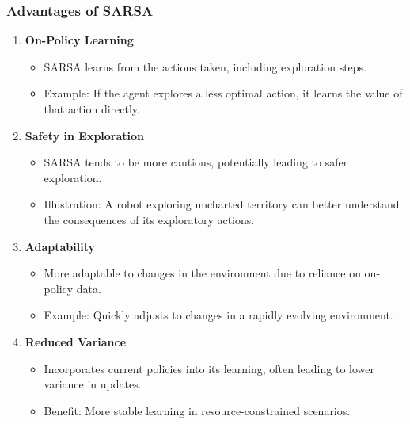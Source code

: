 \documentclass[aspectratio=169]{beamer}
\begin{document}
\begin{frame}[fragile]
    \frametitle{Advantages of SARSA}
    \begin{enumerate}
        \item \textbf{On-Policy Learning}
            \begin{itemize}
                \item SARSA learns from the actions taken, including exploration steps.
                \item Example: If the agent explores a less optimal action, it learns the value of that action directly.
            \end{itemize}
        \item \textbf{Safety in Exploration}
            \begin{itemize}
                \item SARSA tends to be more cautious, potentially leading to safer exploration.
                \item Illustration: A robot exploring uncharted territory can better understand the consequences of its exploratory actions.
            \end{itemize}
        \item \textbf{Adaptability}
            \begin{itemize}
                \item More adaptable to changes in the environment due to reliance on on-policy data.
                \item Example: Quickly adjusts to changes in a rapidly evolving environment.
            \end{itemize}
        \item \textbf{Reduced Variance}
            \begin{itemize}
                \item Incorporates current policies into its learning, often leading to lower variance in updates.
                \item Benefit: More stable learning in resource-constrained scenarios.
            \end{itemize}
    \end{enumerate}
\end{frame}
\end{document}
